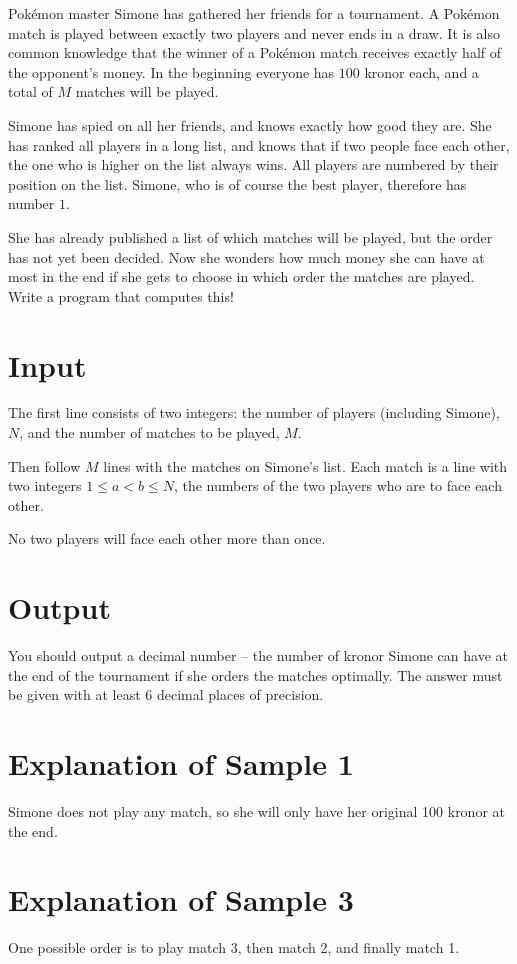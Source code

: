 Pokémon master Simone has gathered her friends for a tournament. A
Pokémon match is played between exactly two players and never ends in a draw. It
is also common knowledge that the winner of a Pokémon match receives exactly half of
the opponent's money. In the beginning everyone has $100$ kronor each, and a total
of $M$ matches will be played.

Simone has spied on all her friends, and knows exactly how good they are. She
has ranked all players in a long list, and knows that if two people face
each other, the one who is higher on the list always wins. All players are numbered by
their position on the list. Simone, who is of course the best player, therefore
has number $1$.

She has already published a list of which matches will be played, but
the order has not yet been decided. Now she wonders how
much money she can have at most in the end if she gets to choose in which order
the matches are played. Write a program that computes this!

\section*{Input}
The first line consists of two integers: the number of players (including Simone), $N$,
and the number of matches to be played, $M$.

Then follow $M$ lines with the matches on Simone's list. Each match is a line
with two integers $1 \le a < b \le N$, the numbers of the two players who are to face each other.

No two players will face each other more than once.

\section*{Output}
You should output a decimal number -- the number of kronor Simone can have at the end of
the tournament if she orders the matches optimally. The answer must be given with at least $6$ decimal places of precision.

\section*{Explanation of Sample 1}
Simone does not play any match, so she will only have her original 100
kronor at the end.

\section*{Explanation of Sample 3}
One possible order is to play match 3, then match 2, and finally match 1.


